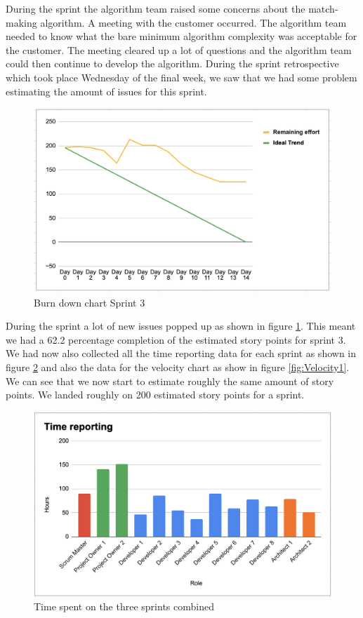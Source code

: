 \documentclass{article}
\begin{document}
During the sprint the algorithm team raised some concerns about the match-making algorithm. A meeting with the customer occurred. The algorithm team needed to know what the bare minimum algorithm complexity was acceptable for the customer. The meeting cleared up a lot of questions and the algorithm team could then continue to develop the algorithm. During the sprint retrospective which took place Wednesday of the final week, we saw that we had some problem estimating the amount of issues for this sprint. 

\begin{figure}[h!]
    \centering
    \includegraphics[scale=0.6]{pfrFigures/Sprint3.png}
    \caption{Burn down chart Sprint 3}
    \label{fig:Burndown3}
\end{figure}

During the sprint a lot of new issues popped up as shown in figure \ref{fig:Burndown3}. This meant we had a 62.2 percentage completion of the estimated story points for sprint 3. We had now also collected all the time reporting data for each sprint as shown in figure \ref{fig:timereport} and also the data for the velocity chart as show in figure \ref{fig:Velocity1}. We can see that we now start to estimate roughly the same amount of story points. We landed roughly on 200 estimated story points for a sprint. 

\begin{figure}[H]
    \centering
    \includegraphics[scale=0.6]{pfrFigures/TimeReporting.png}
    \caption{Time spent on the three sprints combined}
    \label{fig:timereport}
\end{figure}
\end{document}
